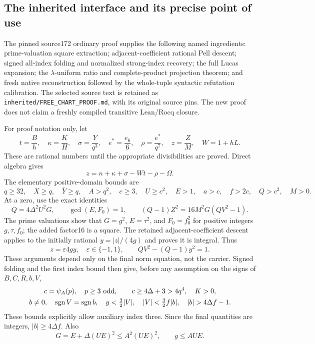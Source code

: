 \subsection{The inherited interface and its precise point of use}

The pinned source172 ordinary proof supplies the following named ingredients:
prime-valuation square extraction; adjacent-coefficient rational Pell descent;
signed all-index folding and normalized strong-index recovery; the full Lucas
expansion; the $\lambda$-uniform ratio and complete-product projection theorem;
and fresh native reconstruction followed by the whole-tuple syntactic
refutation calibration. The selected source text is retained as
\texttt{inherited/FREE\_CHART\_PROOF.md}, with its original source pins.
The new proof does not claim a freshly compiled transitive Lean/Rocq closure.

For proof notation only, let
\[
 t=\frac Bh,\quad \kappa=\frac KH,\quad
 \sigma=\frac{Y}{q^3},\quad e^*=\frac{e_6}{6},\quad
 \rho=\frac{e^*}{q^7},\quad z=\frac ZM,\quad W=1+hL.
\]
These are rational numbers until the appropriate divisibilities are proved.
Direct algebra gives
\begin{equation}
 z=n+\kappa+\sigma-Wt-\rho-\Omega.
 \label{eq:weighted-carrier}
\end{equation}
The elementary positive-domain bounds are
\[
 q\ge32,\quad X\ge q,\quad\bar Y\ge q,\quad A>q^2,
 \quad c\ge3,\quad U\ge c^2,\quad E>1,
 \quad a>c,\quad f>2c,\quad Q>c^2,\quad M>0.
\]
At a zero, use the exact identities
\[
 Q=4\Delta^2U^2G,\qquad \gcd(E,F_0)=1,
 \qquad (Q-1)Z^2=16M^2G(QV^2-1).
\]
The prime valuations show that $G=g^2$, $E=\tau^2$, and $F_0=f_0^2$ for
positive integers $g,\tau,f_0$; the added factor16 is a square. The retained
adjacent-coefficient descent applies to the initially rational
$y=|z|/(4g)$ and proves it is integral. Thus
\begin{equation}
 z=\varepsilon4gy,\quad\varepsilon\in\{-1,1\},\qquad
 QV^2-(Q-1)y^2=1.
 \label{eq:weighted-root}
\end{equation}
These arguments depend only on the final norm equation, not the carrier.
Signed folding and the first index bound then give, before any assumption on
the signs of $B,C,R,b,V$,
\begin{gather}
 c=\psi_A(p),\quad p\ge3\text{ odd},\qquad
 c\ge4\Delta+3>4q^4,\quad K>0,\notag\\
 b\ne0,\quad\operatorname{sgn}V=\operatorname{sgn}b,
 \quad y<\tfrac32|V|,\quad |V|<\tfrac32 f|b|,
 \quad |b|>4\Delta f-1.\label{eq:weighted-inherited-bounds}
\end{gather}
These bounds explicitly allow auxiliary index three. Since the final
quantities are integers, $|b|\ge4\Delta f$. Also
\[
 G=E+\Delta(UE)^2\le A^2(UE)^2,
 \qquad g\le AUE.
\]

